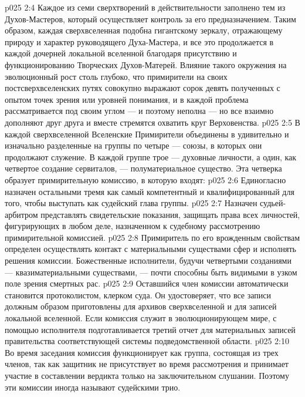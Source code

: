 \vs p025 2:4 Каждое из семи сверхтворений в действительности заполнено тем из Духов\hyp{}Мастеров, который осуществляет контроль за его предназначением. Таким образом, каждая сверхвселенная подобна гигантскому зеркалу, отражающему природу и характер руководящего Духа\hyp{}Мастера, и все это продолжается в каждой дочерней локальной вселенной благодаря присутствию и функционированию Творческих Духов\hyp{}Матерей. Влияние такого окружения на эволюционный рост столь глубоко, что примирители на своих постсверхвселенских путях совокупно выражают сорок девять полученных с опытом точек зрения или уровней понимания, и в каждой проблема рассматривается под своим углом --- и поэтому неполна --- но все взаимно дополняют друг друга и вместе стремятся охватить круг Верховенства.
\vs p025 2:5 \pc В каждой сверхвселенной Вселенские Примирители объединены в удивительно и изначально разделенные на группы по четыре --- союзы, в которых они продолжают служение. В каждой группе трое --- духовные личности, а один, как четвертое создание сервиталов, --- полуматериальное существо. Эта четверка образует примирительную комиссию, в которую входят:
\vs p025 2:6 \bibnobreakspace {} Единогласно назначен остальными тремя как самый компетентный и квалифицированный для того, чтобы выступать как судейский глава группы.
\vs p025 2:7 \bibnobreakspace {} Назначен судьей\hyp{}арбитром представлять свидетельские показания, защищать права всех личностей, фигурирующих в любом деле, назначенном к судебному рассмотрению примирительной комиссией.
\vs p025 2:8 \bibnobreakspace {} Примиритель по его врожденным свойствам определен осуществлять контакт с материальными существами сфер и исполнять решения комиссии. Божественные исполнители, будучи четвертыми созданиями --- квазиматериальными существами, --- почти способны быть видимыми в узком поле зрения смертных рас.
\vs p025 2:9 \bibnobreakspace {} Оставшийся член комиссии автоматически становится протоколистом, клерком суда. Он удостоверяет, что все записи должным образом приготовлены для архивов сверхвселенной и для записей локальной вселенной. Если комиссия служит в эволюционирующем мире, с помощью исполнителя подготавливается третий отчет для материальных записей правительства соответствующей системы подведомственной области.
\vs p025 2:10 \pc Во время заседания комиссия функционирует как группа, состоящая из трех членов, так как защитник не присутствует во время рассмотрения и принимает участие в составлении вердикта только на заключительном слушании. Поэтому эти комиссии иногда называют судейскими трио.
